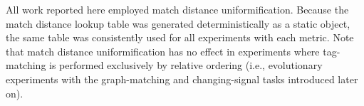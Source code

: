 All work reported here employed match distance uniformification.
Because the match distance lookup table was generated deterministically as a static object, the same table was consistently used for all experiments with each metric.
Note that match distance uniformification has no effect in experiments where tag-matching is performed exclusively by relative ordering (i.e., evolutionary experiments with the graph-matching and changing-signal tasks introduced later on).
